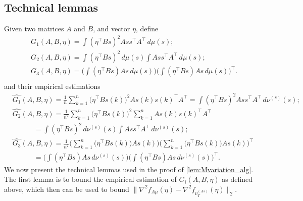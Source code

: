 \subsection{Technical lemmas}
Given two matrices $A$ and $B$, and vector $\eta$, 
define  
\begin{align*}
& G_1(A,B,\eta) = \int (\eta^{\top}Bs)^2Ass^{\top}A^{\top}\,d\mu(s); \\
& G_2(A,B,\eta) = \int (\eta^{\top}Bs)^2\,d\mu(s) \int Ass^{\top}A^{\top} \,d\mu(s); \\
& G_3(A,B,\eta) = \Big(\int (\eta^{\top}Bs)As\,d\mu(s)\Big)\Big(\int (\eta^{\top}Bs)As\,d\mu(s)\Big)^{\top}. \\
\end{align*}
and their empirical estimations
\begin{align*}
&\widehat{G_1}(A,B,\eta) = \frac1n\sum_{k=1}^{n} \big(\eta^{\top}Bs(k)\big)^2As(k)s(k)^{\top}A^{\top} = \int (\eta^{\top}Bs)^2Ass^{\top}A^{\top}\,d\nu^{(s)}(s); \\
& \widehat{G_2}(A,B,\eta) = \frac{1}{n^2}\sum_{k=1}^{n} \big(\eta^{\top}Bs(k)\big)^2 \sum_{k=1}^{n}As(k)s(k)^{\top}A^{\top} \\
& \quad \qquad = \int (\eta^{\top}Bs)^2\,d\nu^{(s)}(s) \int Ass^{\top}A^{\top} \,d\nu^{(s)}(s); \\
& \widehat{G_3}(A,B,\eta) = \frac{1}{n^2}\Big(\sum_{k=1}^{n} \big(\eta^{\top}Bs(k)\big)As(k)\Big) \Big(\sum_{k=1}^{n} \big(\eta^{\top}Bs(k)\big)As(k)\Big)^{\top} \\
& \qquad \quad = \Big(\int (\eta^{\top}Bs)As\,d\nu^{(s)}(s)\Big)\Big(\int (\eta^{\top}Bs)As\,d\nu^{(s)}(s)\Big)^{\top}.
\end{align*}
We now present the technical lemmas used in the proof of \cref{lem:Mvariation_alg}.
The first lemma is to bound the empirical estimation of $G_i(A,B,\eta)$ as defined above, which then can be used to bound $\|\nabla^2 f_{A\mu}(\eta) - \nabla^2 f_{\nu_T^{(As)}}(\eta)  \|_2$. 

